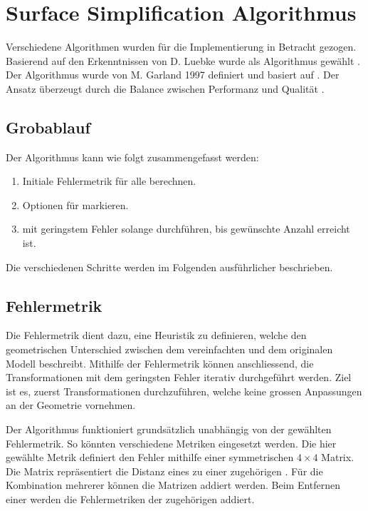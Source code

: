 \section{Surface Simplification Algorithmus}
\label{chap:surfaceSimplificationAlgorithm}
Verschiedene Algorithmen wurden für die Implementierung in Betracht gezogen. Basierend auf den Erkenntnissen von D. Luebke wurde als Algorithmus  gewählt \cite{luebkeAlgorithmComparison}. Der Algorithmus wurde von M. Garland 1997 definiert und basiert auf . Der Ansatz überzeugt durch die Balance zwischen Performanz und Qualität \cite{surfaceSimplificationUsingQuadricErrorMetrices}\cite{surfaceSimplificationWithColorUsingQuadricErrorMetrices}.

\pagebreak

\subsection{Grobablauf}
Der Algorithmus kann wie folgt zusammengefasst werden:

\begin{enumerate}
  \item Initiale Fehlermetrik für alle  berechnen.
  \item Optionen für  markieren.
  \item {} mit geringstem Fehler solange durchführen, bis gewünschte Anzahl  erreicht ist.
\end{enumerate}

Die verschiedenen Schritte werden im Folgenden ausführlicher beschrieben.

\subsection{Fehlermetrik}
Die Fehlermetrik dient dazu, eine Heuristik zu definieren, welche den geometrischen Unterschied zwischen dem vereinfachten und dem originalen Modell beschreibt. Mithilfe der Fehlermetrik können anschliessend, die Transformationen mit dem geringsten Fehler iterativ durchgeführt werden. Ziel ist es, zuerst Transformationen durchzuführen, welche keine grossen Anpassungen an der Geometrie vornehmen.

Der Algorithmus funktioniert grundsätzlich unabhängig von der gewählten Fehlermetrik. So könnten verschiedene Metriken eingesetzt werden.
Die hier gewählte Metrik definiert den Fehler mithilfe einer symmetrischen $4\times 4$ Matrix. Die Matrix repräsentiert die Distanz eines  zu einer zugehörigen . Für die Kombination mehrerer  können die Matrizen addiert werden. Beim Entfernen einer  werden die Fehlermetriken der zugehörigen  addiert.

